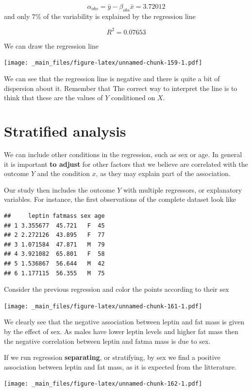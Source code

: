 \documentclass[
]{book}
\begin{document}
\[\alpha_{obs}=\bar{y}-\beta_{obs}\bar{x}= 3.72012\]
and only \(7\%\) of the variability is explained by the regression line

\[R^2=0.07653\]

We can draw the regression line

\texttt{[image: \_main\_files/figure-latex/unnamed-chunk-159-1.pdf]}

We can see that the regression line is negative and there is quite a bit of dispersion about it. Remember that The correct way to interpret the line is to think that these are the values of \(Y\) conditioned on \(X\).

\hypertarget{stratified-analysis}{%
\section{Stratified analysis}\label{stratified-analysis}}

We can include other conditions in the regression, such as sex or age. In general it is important \textbf{to adjust} for other factors that we believe are correlated with the outcome \(Y\) and the condition \(x\), as they may explain part of the association.

Our study then includes the outcome \(Y\) with multiple regressors, or explanatory variables. For instance, the first observations of the complete dataset look like

\begin{verbatim}
##     leptin fatmass sex age
## 1 3.355677  45.721   F  45
## 2 2.272126  43.895   F  77
## 3 1.071584  47.871   M  79
## 4 3.921082  65.801   F  58
## 5 1.536867  56.644   M  42
## 6 1.177115  56.355   M  75
\end{verbatim}

Consider the previous regression and color the points according to their sex

\texttt{[image: \_main\_files/figure-latex/unnamed-chunk-161-1.pdf]}

We clearly see that the negative association between leptin and fat mass is given by the effect of sex. As males have lower leptin levels and higher fat mass then the negative correlation between leptin and fatma mass is due to sex.

If we run regression \textbf{separating}, or stratifying, by sex we find a positive association between leptin and fat mass, as it is expected from the litterature.

\texttt{[image: \_main\_files/figure-latex/unnamed-chunk-162-1.pdf]}
\end{document}
